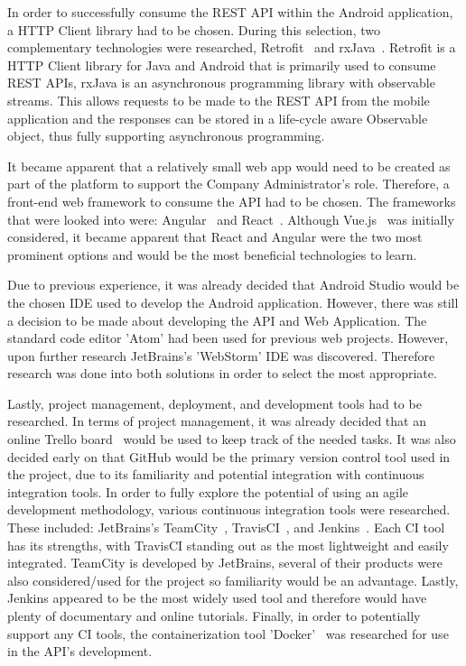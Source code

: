 In order to successfully consume the REST API within the Android application, a HTTP Client library had to be chosen. During this selection, two complementary technologies were researched, Retrofit~\cite{retrofit_documentation_ref} and rxJava~\cite{rxjava_documentation_ref}. Retrofit is a HTTP Client library for Java and Android that is primarily used to consume REST APIs, rxJava is an asynchronous programming library with observable streams. This allows requests to be made to the REST API from the mobile application and the responses can be stored in a life-cycle aware Observable object, thus fully supporting asynchronous programming.

It became apparent that a relatively small web app would need to be created as part of the platform to support the Company Administrator's role. Therefore, a front-end web framework to consume the API had to be chosen. The frameworks that were looked into were: Angular~\cite{angular_documentation_ref} and React~\cite{react_documentation_ref}. Although Vue.js~\cite{vue_documentation_ref} was initially considered, it became apparent that React and Angular were the two most prominent options and would be the most beneficial technologies to learn.

Due to previous experience, it was already decided that Android Studio would be the chosen IDE used to develop the Android application. However, there was still a decision to be made about developing the API and Web Application. The standard code editor 'Atom' had been used for previous web projects. However, upon further research JetBrains's 'WebStorm' IDE was discovered. Therefore research was done into both solutions in order to select the most appropriate.

Lastly, project management, deployment, and development tools had to be researched. In terms of project management, it was already decided that an online Trello board~\cite{trello_ref} would be used to keep track of the needed tasks. It was also decided early on that GitHub would be the primary version control tool used in the project, due to its familiarity and potential integration with continuous integration tools. In order to fully explore the potential of using an agile development methodology, various continuous integration tools were researched. These included: JetBrains's TeamCity~\cite{teamcity_documentation_ref}, TravisCI~\cite{travis_documentation_ref}, and Jenkins~\cite{jenkins_documentation_ref}. Each CI tool has its strengths, with TravisCI standing out as the most lightweight and easily integrated. TeamCity is developed by JetBrains, several of their products were also considered/used for the project so familiarity would be an advantage. Lastly, Jenkins appeared to be the most widely used tool and therefore would have plenty of documentary and online tutorials. Finally, in order to potentially support any CI tools, the containerization tool 'Docker'~\cite{docker_documentation_ref} was researched for use in the API's development.

